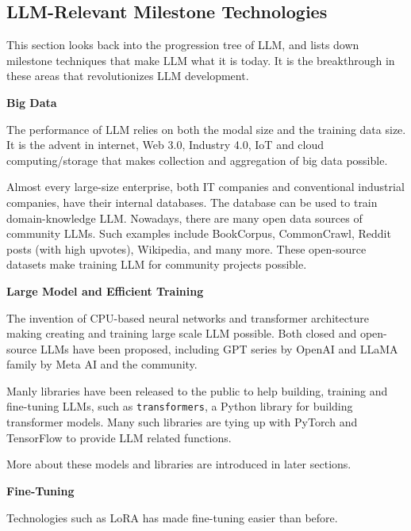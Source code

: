 \subsection{LLM-Relevant Milestone Technologies}

This section looks back into the progression tree of LLM, and lists down milestone techniques that make LLM what it is today. It is the breakthrough in these areas that revolutionizes LLM development.

\vspace{0.1in}
\noindent \textbf{Big Data}
\vspace{0.1in}

The performance of LLM relies on both the modal size and the training data size. It is the advent in internet, Web 3.0, Industry 4.0, IoT and cloud computing/storage that makes collection and aggregation of big data possible.

Almost every large-size enterprise, both IT companies and conventional industrial companies, have their internal databases. The database can be used to train domain-knowledge LLM. Nowadays, there are many open data sources of community LLMs. Such examples include BookCorpus, CommonCrawl, Reddit posts (with high upvotes), Wikipedia, and many more. These open-source datasets make training LLM for community projects possible.

\vspace{0.1in}
\noindent \textbf{Large Model and Efficient Training}
\vspace{0.1in}

The invention of CPU-based neural networks and transformer architecture making creating and training large scale LLM possible. Both closed and open-source LLMs have been proposed, including GPT series by OpenAI and LLaMA family by Meta AI and the community.

Manly libraries have been released to the public to help building, training and fine-tuning LLMs, such as \verb|transformers|, a Python library for building transformer models. Many such libraries are tying up with PyTorch and TensorFlow to provide LLM related functions.

More about these models and libraries are introduced in later sections.

\vspace{0.1in}
\noindent \textbf{Fine-Tuning}
\vspace{0.1in}

Technologies such as LoRA has made fine-tuning easier than before.

